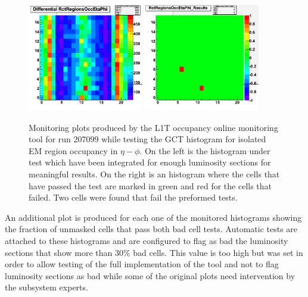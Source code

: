 \begin{figure}[!htb]
\centering
\includegraphics[width=0.45\textwidth]{Chapter03/L1TOnline/Images/L1TOccupancy_Diff.png}
\includegraphics[width=0.45\textwidth]{Chapter03/L1TOnline/Images/L1TOccupancy_Results.png}
\caption[Monitoring plots produced by the L1T occupancy online monitoring tool for run 207099 while testing the GCT histogram for isolated EM region occupancy in $\eta-\phi$.]
{Monitoring plots produced by the \gls{L1T} occupancy online monitoring tool for run 207099 while testing the \gls{GCT} histogram for isolated \gls{EM} region occupancy in $\eta-\phi$. On the left is the histogram under test which have been integrated for enough luminosity sections for meaningful results. On the right is an histogram where the cells that have passed the test are marked in green and red for the cells that failed. Two cells were found that fail the preformed tests.}
\label{FIGURE:TechnicalWork_L1TOccupancyTests}
\end{figure}

An additional plot is produced for each one of the monitored histograms showing the fraction of unmasked cells that pass both bad cell tests. Automatic tests are attached to these histograms and are configured to flag as bad the luminosity sections that show more than 30\% bad cells. This value is too high but was set in order to allow testing of the full implementation of the tool and not to flag luminosity sections as bad while some of the original plots need intervention by the subsystem experts.

